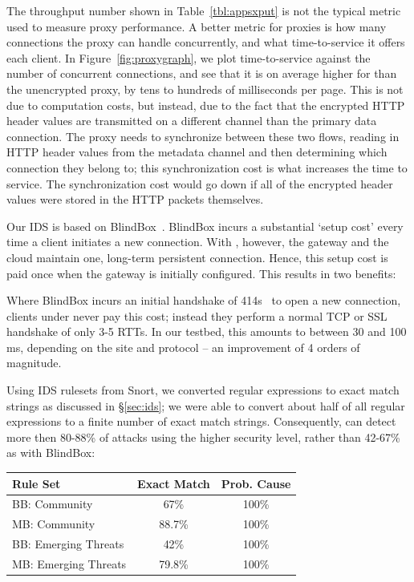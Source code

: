  The throughput number shown in Table~\ref{tbl:appsxput} is not the typical metric used to measure proxy performance. A better metric for proxies is how many connections the proxy can handle concurrently, and what time-to-service it offers each client. In Figure~\ref{fig:proxygraph}, we plot time-to-service against the number of concurrent connections, and see that it is on average higher for \sys than the unencrypted proxy, by tens to hundreds of milliseconds per page.
This is not due to computation costs, but instead, due to the fact that the encrypted HTTP header values are transmitted on a different channel than the primary data connection.
The \sys proxy needs to synchronize between these two flows, reading in HTTP header values from the metadata channel and then determining which connection they belong to; this synchronization cost is what increases the time to service. 
The synchronization cost would go down if all of the encrypted header values were stored in the HTTP packets themselves.


Our IDS is based on BlindBox~\cite{blindbox}. BlindBox incurs a substantial `setup cost' every time a client initiates a new connection. With \sys, however, the gateway and the cloud maintain one, long-term persistent connection. 
Hence, this setup cost is paid once when the gateway is initially configured. This results in two benefits:

 Where BlindBox incurs an initial handshake of 414s~\cite{blindbox} to open a new connection, clients under \sys never pay this cost; instead they perform a normal TCP or SSL handshake of only 3-5 RTTs. In our testbed, this amounts to between 30 and 100 ms, depending on the site and protocol -- an improvement of 4 orders of magnitude.

Using IDS rulesets from Snort, we converted regular expressions to exact match strings as discussed in \S\ref{sec:ids}; we were able to convert about half of all regular expressions to a finite number of exact match strings. 
Consequently, \sys can detect more then 80-88\% of attacks using the higher security level, rather than 42-67\% as with BlindBox:

\begin{table}[h]
  \centering
  \small
  \begin{tabular}{l|c|c}
    {{\bf Rule Set}}&{\bf Exact Match}&{\bf Prob. Cause}\\
    \hline
    \hline
    BB: Community&67\%&100\%\\
    \hline
    MB: Community&88.7\%&100\%\\

    \hline
    \hline
    BB: Emerging Threats&42\%&100\%\\
    \hline
    MB: Emerging Threats&79.8\%&100\%\\
    \hline
  \end{tabular}
\end{table}


